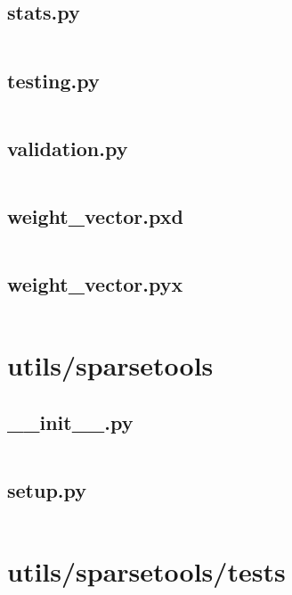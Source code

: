 \documentclass{article}
\begin{document}
\subsection{stats.py}
\inputminted{python}{/home/dufferzafar/dev/@clones/scikit-learn/sklearn/utils/stats.py}
\newpage

\subsection{testing.py}
\inputminted{python}{/home/dufferzafar/dev/@clones/scikit-learn/sklearn/utils/testing.py}
\newpage

\subsection{validation.py}
\inputminted{python}{/home/dufferzafar/dev/@clones/scikit-learn/sklearn/utils/validation.py}
\newpage

\subsection{weight\_vector.pxd}
\inputminted{cython}{/home/dufferzafar/dev/@clones/scikit-learn/sklearn/utils/weight_vector.pxd}
\newpage

\subsection{weight\_vector.pyx}
\inputminted{cython}{/home/dufferzafar/dev/@clones/scikit-learn/sklearn/utils/weight_vector.pyx}
\newpage

\section{utils/sparsetools}

\subsection{\_\_init\_\_.py}
\inputminted{python}{/home/dufferzafar/dev/@clones/scikit-learn/sklearn/utils/sparsetools/__init__.py}
\newpage

\subsection{setup.py}
\inputminted{python}{/home/dufferzafar/dev/@clones/scikit-learn/sklearn/utils/sparsetools/setup.py}
\newpage

\section{utils/sparsetools/tests}
\end{document}
